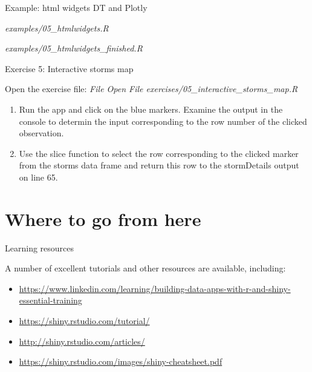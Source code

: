 \documentclass[
  12pt,
  ignorenonframetext,
]{beamer}
\providecommand{\tightlist}{%
  \setlength{\itemsep}{0pt}\setlength{\parskip}{0pt}}
\begin{document}
\begin{frame}{Example: html widgets DT and Plotly}
\protect\hypertarget{example-html-widgets-dt-and-plotly}{}

\begin{description}
\tightlist
\item[Start]
\emph{examples/05\_htmlwidgets.R}
\item[Finished]
\emph{examples/05\_htmlwidgets\_finished.R}
\end{description}

\end{frame}

\begin{frame}{Exercise 5: Interactive storms map}
\protect\hypertarget{exercise-5-interactive-storms-map}{}

Open the exercise file: \emph{File \rightarrow Open File
\rightarrow exercises/05\_interactive\_storms\_map.R}

\begin{enumerate}
\item
  Run the app and click on the blue markers. Examine the output in the
  console to determin the input corresponding to the row number of the
  clicked observation.
\item
  Use the slice function to select the row corresponding to the clicked
  marker from the storms data frame and return this row to the
  stormDetails output on line 65.
\end{enumerate}

\end{frame}

\hypertarget{where-to-go-from-here}{%
\section{Where to go from here}\label{where-to-go-from-here}}

\begin{frame}{Learning resources}
\protect\hypertarget{learning-resources}{}

A number of excellent tutorials and other resources are available,
including:

\begin{itemize}
\item
  \url{https://www.linkedin.com/learning/building-data-apps-with-r-and-shiny-essential-training}
\item
  \url{https://shiny.rstudio.com/tutorial/}
\item
  \url{http://shiny.rstudio.com/articles/}
\item
  \url{https://shiny.rstudio.com/images/shiny-cheatsheet.pdf}
\end{itemize}

\end{frame}
\end{document}
